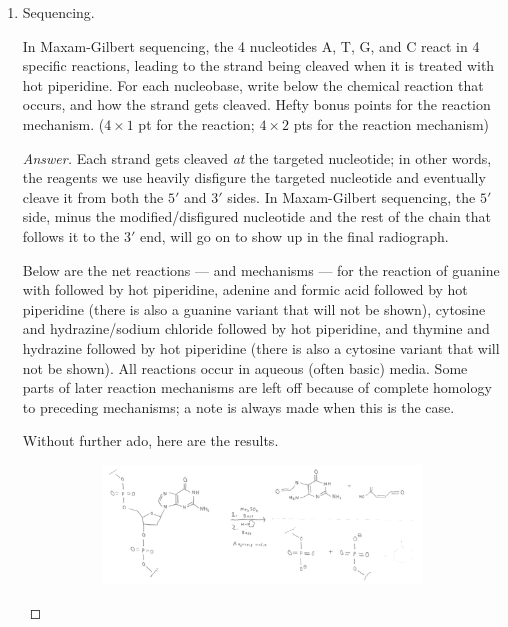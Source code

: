 \documentclass[../psets.tex]{subfiles}
\begin{document}
\begin{enumerate}
\begin{enumerate}
\begin{proof}[Answer]
            \begin{align*}
                \num{1048576}-31 &= \num{1048545}&
                31 &
            \end{align*} 
            target DNA and variable length strands, respectively, in agreement with the above.
        \end{proof}
    \end{enumerate}
    \item Sequencing.\par
    In Maxam-Gilbert sequencing, the 4 nucleotides A, T, G, and C react in 4 specific reactions, leading to the strand being cleaved when it is treated with hot piperidine. For each nucleobase, write below the chemical reaction that occurs, and how the strand gets cleaved. Hefty bonus points for the reaction mechanism. ($4\times 1$ pt for the reaction; $4\times 2$ pts for the reaction mechanism)
    \begin{proof}[Answer]
        Each strand gets cleaved \emph{at} the targeted nucleotide; in other words, the reagents we use heavily disfigure the targeted nucleotide and eventually cleave it from both the $5'$ and $3'$ sides. In Maxam-Gilbert sequencing, the $5'$ side, minus the modified/disfigured nucleotide and the rest of the chain that follows it to the $3'$ end, will go on to show up in the final radiograph.\par
        Below are the net reactions --- and mechanisms --- for the reaction of guanine with  followed by hot piperidine, adenine and formic acid followed by hot piperidine (there is also a guanine variant that will not be shown), cytosine and hydrazine/sodium chloride followed by hot piperidine, and thymine and hydrazine followed by hot piperidine (there is also a cytosine variant that will not be shown). All reactions occur in aqueous (often basic) media. Some parts of later reaction mechanisms are left off because of complete homology to preceding mechanisms; a note is always made when this is the case.\par
        Without further ado, here are the results.
        \begin{figure}[H]
            \centering
            \begin{subfigure}[b]{\linewidth}
                \centering
                \includegraphics[width=\linewidth]{../ExtFiles/pset3-netRxnG.png}

\end{subfigure}
\end{figure}
\end{proof}
\end{enumerate}
\end{document}
